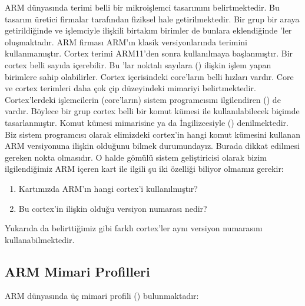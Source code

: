 \documentclass[letterpaper,10pt,turkish]{sphinxmanual}
\begin{document}
\sphinxAtStartPar
ARM dünyasında  terimi belli bir mikroişlemci tasarımını belirtmektedir. Bu tasarım üretici
firmalar tarafından fiziksel hale getirilmektedir. Bir grup  bir araya getirildiğinde ve
işlemciyle ilişkili birtakım birimler de bunlara eklendiğinde ’ler oluşmaktadır. ARM
firması ARM’ın klasik versiyonlarında  terimini kullanmamıştır. Cortex terimi ARM11’den
sonra kullanılmaya başlanmıştır. Bir cortex belli sayıda  içerebilir. Bu ’lar noktalı
sayılara () ilişkin işlem yapan birimlere sahip olabilirler. Cortex içerisindeki
core’ların belli hızları vardır. Core ve cortex terimleri daha çok çip düzeyindeki mimariyi
belirtmektedir. Cortex’lerdeki işlemcilerin (core’ların) sistem programcısını ilgilendiren
 () de vardır. Böylece bir grup cortex belli bir komut kümesi
ile kullanılabilecek biçimde tasarlanmıştır. Komut kümesi mimarisine  ya da
İngilizcesiyle  () denilmektedir. Biz sistem programcısı
olarak elimizdeki cortex’in hangi komut kümesini kullanan ARM versiyonuna ilişkin olduğunu
bilmek durumundayız. Burada dikkat edilmesi gereken nokta  olmasıdır. O halde gömülü sistem geliştiricisi
olarak bizim ilgilendiğimiz ARM içeren kart ile ilgili şu iki özelliği biliyor olmamız gerekir:
\begin{enumerate}
%
\item {} 
\sphinxAtStartPar
Kartımızda ARM’ın hangi cortex’i kullanılmıştır?

\item {} 
\sphinxAtStartPar
Bu cortex’in ilişkin olduğu versiyon numarası nedir?

\end{enumerate}

\sphinxAtStartPar
Yukarıda da belirttiğimiz gibi farklı cortex’ler aynı versiyon numarasını kullanabilmektedir.


\subsection{ARM Mimari Profilleri}
\label{\detokenize{introduction:arm-mimari-profilleri}}
\sphinxAtStartPar
ARM dünyasında üç mimari profili () bulunmaktadır:
\end{document}
